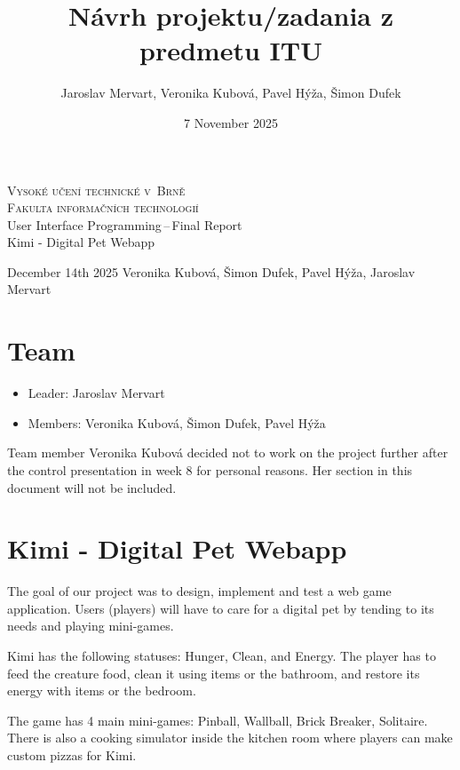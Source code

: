 \documentclass[11pt]{article}
\title{Návrh projektu/zadania z predmetu ITU}
\author{Jaroslav Mervart, Veronika Kubová, Pavel Hýža, Šimon Dufek}
\date{7 November 2025}
\begin{document}
\begin{titlepage}
\begin{center}
    \Huge
	\textsc{Vysoké učení technické v~Brně}\\
    \huge
	{\textsc{Fakulta informačních technologií }}\\
	
	\LARGE
	User Interface Programming\,--\,Final Report\\
	\Huge
    Kimi - \large Digital Pet Webapp\\
	
\end{center}
{\large December 14th 2025 \hfill
Veronika Kubová, Šimon Dufek, Pavel Hýža, Jaroslav Mervart}
\end{titlepage}
\newpage

\clearpage
\thispagestyle{empty}
\small
\tableofcontents
\clearpage

\section{Team}

\begin{itemize}
    \item Leader: Jaroslav Mervart
    \item Members: Veronika Kubová, Šimon Dufek, Pavel Hýža
\end{itemize}
Team member Veronika Kubová decided not to work on the project further after the control presentation in week 8 for personal reasons. Her section in this document will not be included.

\section{Kimi - Digital Pet Webapp}
The goal of our project was to design, implement and test a web game application. Users (players) will have to care for a digital pet by tending to its needs and playing mini-games.

Kimi has the following statuses: Hunger, Clean, and Energy. The player has to feed the creature food, clean it using items or the bathroom, and restore its energy with items or the bedroom.

The game has 4 main mini-games: Pinball, Wallball, Brick Breaker, Solitaire. There is also a cooking simulator inside the kitchen room where players can make custom pizzas for Kimi.
\end{document}
